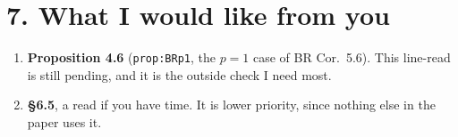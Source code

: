 \documentclass[11pt]{article}
\begin{document}
\section*{7. What I would like from you}
\begin{enumerate}[1.]
\item \textbf{Proposition 4.6} (\texttt{prop:BRp1}, the $p=1$ case of BR Cor.~5.6). This line-read is still pending,
and it is the outside check I need most.
\item \textbf{\S6.5}, a read if you have time. It is lower priority, since nothing else in the paper uses it.
\end{enumerate}
\end{document}
